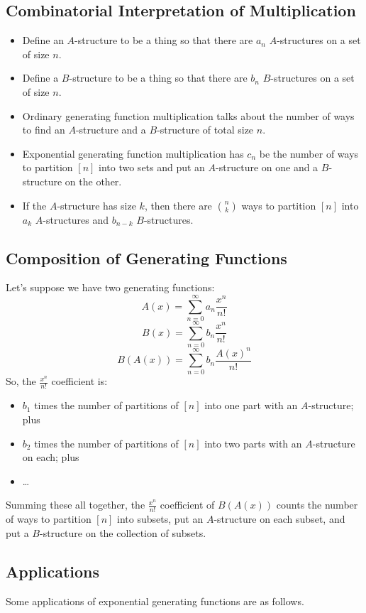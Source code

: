 \documentclass[letterpaper]{article}
\begin{document}
\subsection{Combinatorial Interpretation of Multiplication}
\begin{itemize}
    \item Define an $A$-structure to be a thing so that there are $a_n$ $A$-structures on a set of size $n$. 
    \item Define a $B$-structure to be a thing so that there are $b_n$ $B$-structures on a set of size $n$. 
    \item Ordinary generating function multiplication talks about the number of ways to find an $A$-structure and a $B$-structure of total size $n$. 
    \item Exponential generating function multiplication has $c_n$ be the number of ways to partition $[n]$ into two sets and put an $A$-structure on one and a $B$-structure on the other. 
    \item If the $A$-structure has size $k$, then there are $\binom{n}{k}$ ways to partition $[n]$ into $a_k$ $A$-structures and $b_{n - k}$ $B$-structures.
\end{itemize}

\subsection{Composition of Generating Functions}
Let's suppose we have two generating functions:
\[A(x) = \sum_{n = 0}^{\infty} a_n \frac{x^n}{n!}\]
\[B(x) = \sum_{n = 0}^{\infty} b_n \frac{x^n}{n!}\]
\[B(A(x)) = \sum_{n = 0}^{\infty} b_n \frac{A(x)^n}{n!}\]
So, the $\frac{x^n}{n!}$ coefficient is:
\begin{itemize}
    \item $b_1$ times the number of partitions of $[n]$ into one part with an $A$-structure; plus
    \item $b_2$ times the number of partitions of $[n]$ into two parts with an $A$-structure on each; plus 
    \item \dots 
\end{itemize}

Summing these all together, the $\frac{x^n}{n!}$ coefficient of $B(A(x))$ counts the number of ways to partition $[n]$ into subsets, put an $A$-structure on each subset, and put a $B$-structure on the collection of subsets.

\subsection{Applications}
Some applications of exponential generating functions are as follows. 
\end{document}
